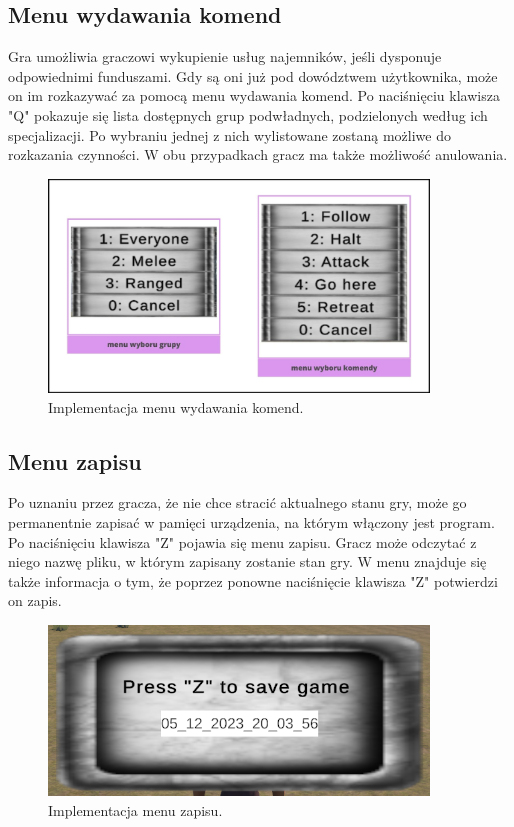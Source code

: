\subsection{Menu wydawania komend}
Gra umożliwia graczowi wykupienie usług najemników, jeśli dysponuje odpowiednimi funduszami. Gdy są oni już pod dowództwem użytkownika, może on im rozkazywać za pomocą 
menu wydawania komend. Po naciśnięciu klawisza "Q" pokazuje się lista dostępnych grup podwładnych, podzielonych według ich specjalizacji. Po wybraniu jednej z nich 
wylistowane zostaną możliwe do rozkazania czynności. W obu przypadkach gracz ma także możliwość anulowania. 
\begin{figure}[htbp]
    \centering
    \includegraphics[width=0.9\textwidth]{images/ui/opis_ekementow_mwnu_wyboru_komendy.png}
    \caption{Implementacja menu wydawania komend.}\label{fig:cmd_menu}
\end{figure}
\FloatBarrier

\subsection{Menu zapisu}
Po uznaniu przez gracza, że nie chce stracić aktualnego stanu gry, może go permanentnie zapisać w pamięci urządzenia, na którym włączony jest program. Po naciśnięciu 
klawisza "Z" pojawia się menu zapisu. Gracz może odczytać z niego nazwę pliku, w którym zapisany zostanie stan gry. W menu znajduje się także informacja o tym, że 
poprzez ponowne naciśnięcie klawisza "Z" potwierdzi on zapis. 
\begin{figure}[htbp]
    \centering
    \includegraphics[width=0.9\textwidth]{images/ui/menu_zapisu.png}
    \caption{Implementacja menu zapisu.}\label{fig:men_zap}
\end{figure}
\FloatBarrier

